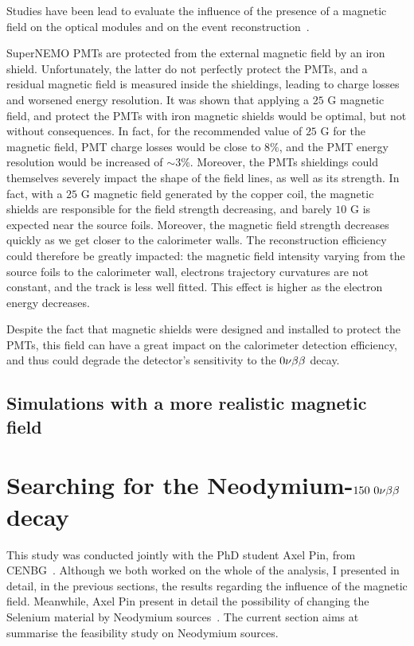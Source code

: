 Studies have been lead to evaluate the influence of the presence of a magnetic field on the optical modules and on the event reconstruction~\cite{CalvezThesis}\cite{internal:magnetic_field}.

SuperNEMO PMTs are protected from the external magnetic field by an iron shield.
Unfortunately, the latter do not perfectly protect the PMTs, and a residual magnetic field is measured inside the shieldings, leading to charge losses and worsened energy resolution.
It was shown that applying a $25$ G magnetic field, and protect the PMTs with iron magnetic shields would be optimal, but not without consequences.
In fact, for the recommended value of $25$ G for the magnetic field, PMT charge losses would be close to $8\%$, and the PMT energy resolution would be increased of $\sim 3\%$.
Moreover, the PMTs shieldings could themselves severely impact the shape of the field lines, as well as its strength.
In fact, with a $25$ G magnetic field generated by the copper coil, the magnetic shields are responsible for the field strength decreasing, and barely $10$ G is expected near the source foils.
Moreover, the magnetic field strength decreases quickly as we get closer to the calorimeter walls.
The reconstruction efficiency could therefore be greatly impacted:
the magnetic field intensity varying from the source foils to the calorimeter wall, electrons trajectory curvatures are not constant, and the track is less well fitted.
This effect is higher as the electron energy decreases.

Despite the fact that magnetic shields were designed and installed to protect the PMTs, this field can have a great impact on the calorimeter detection efficiency, and thus could degrade the detector's sensitivity to the $0\nu\beta\beta$ decay.

\subsection{Simulations with a more realistic magnetic field}
\label{subsec:mapped_field}

\section{Searching for the Neodymium-$150~0\nu\beta\beta$ decay}
\label{sec:Nd}

This study was conducted jointly with the PhD student Axel Pin, from CENBG~\cite{}.
Although we both worked on the whole of the analysis, I presented in detail, in the previous sections, the results regarding the influence of the magnetic field.
Meanwhile, Axel Pin present in detail the possibility of changing the Selenium material by Neodymium sources~\cite{AxelThesis}.
The current section aims at summarise the feasibility study on Neodymium sources.

